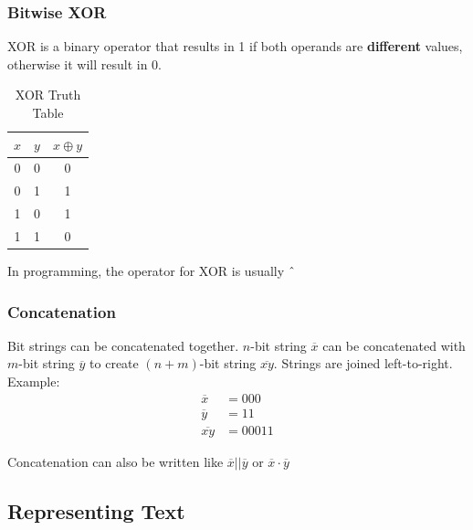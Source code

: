 \documentclass{article}
\begin{document}
\subsubsection{Bitwise XOR} \label{Bitwise XOR}
XOR is a binary operator that results in 1 if both operands are \textbf{different} values,
otherwise it will result in 0.
\begin{table}[h]
    \centering
    \caption{XOR Truth Table}
    \begin{tabular}{c|c|c}
        \(x\) & \(y\) & \(x \oplus y\) \\ \hline
        0     & 0     & 0              \\
        0     & 1     & 1              \\
        1     & 0     & 1              \\
        1     & 1     & 0              \\
    \end{tabular}
\end{table}
\begin{tcolorbox}[title=Note]
    In programming, the operator for XOR is usually \(\string^\)
\end{tcolorbox}
%
\newpage
\subsubsection{Concatenation}
Bit strings can be concatenated together.
\(n\)-bit string \(\overline{x}\) can be concatenated with \(m\)-bit string \(\overline{y}\)
to create \((n + m)\)-bit string \(\overline{xy}\). Strings are joined left-to-right. \\
Example:
\begin{align*}
    \overline{x} &= 000 \\
    \overline{y} &= 11 \\
    \overline{xy} &= 00011
\end{align*}
\begin{tcolorbox}[title=Note]
    Concatenation can also be written like \(\overline{x} \lvert \rvert \overline{y}\)
    or \(\overline{x} \cdot \overline{y}\)
\end{tcolorbox}

\subsection{Representing Text}
\end{document}
